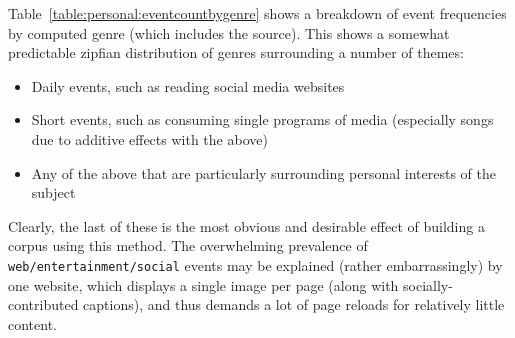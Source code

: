 Table~\ref{table:personal:eventcountbygenre} shows a breakdown of event frequencies by computed genre  (which includes the source).  This shows a somewhat predictable zipfian distribution of genres surrounding a number of themes:

\begin{itemize}
    \item Daily events, such as reading social media websites
    \item Short events, such as consuming single programs of media (especially songs due to additive effects with the above)
    \item Any of the above that are particularly surrounding personal interests of the subject
\end{itemize}

Clearly, the last of these is the most obvious and desirable effect of building a corpus using this method.  The overwhelming prevalence of \texttt{web/entertainment/social} events may be explained (rather embarrassingly) by one website, which displays a single image per page (along with socially-contributed captions), and thus demands a lot of page reloads for relatively little content.


